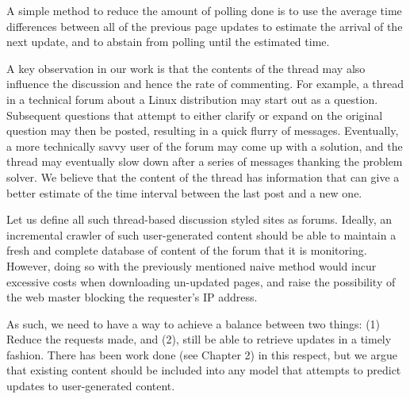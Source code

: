 A simple method to reduce the amount of polling done is to use the
average time differences between all of the previous page updates to estimate 
the arrival of the next update, and to abstain from polling until the
estimated time.


A key observation in our work is that the contents of the thread may
also influence the discussion and hence the rate of commenting. For example, a 
thread in a technical forum about a Linux distribution may start out as a 
question. Subsequent questions that attempt to either clarify or expand on the 
original question may then be posted, resulting in a quick flurry of messages.  
Eventually, a more technically savvy user of the forum may come up with a 
solution, and the thread may eventually slow down after a series of messages 
thanking the problem solver. We believe that the content of the thread has 
information that can give a better estimate of the time interval between the 
last post and a new one.





Let us define all such thread-based discussion styled sites as forums. Ideally, 
an incremental crawler of such user-generated content should be able to maintain 
a fresh and complete database of content of the forum that it is monitoring.  
However, doing so with the previously mentioned naive method would incur 
excessive costs when downloading un-updated pages, and raise the possibility of 
the web master blocking the requester's IP address.

As such, we need to have a way to achieve a balance between two things: (1) 
Reduce the requests made, and (2), still be able to retrieve updates in a timely 
fashion. There has been work done (see Chapter 2) in this respect, but we argue 
that existing content should be included into any model that attempts to predict 
updates to user-generated content.

